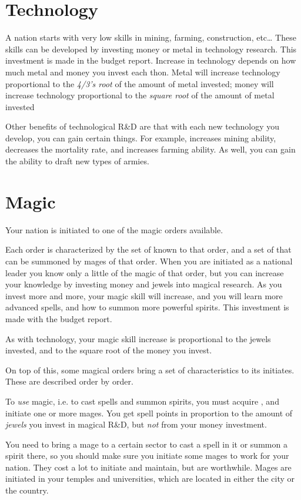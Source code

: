 \section{Technology}
A nation starts with very low skills in mining, farming, construction,
etc\dots{} These skills can be developed by investing money or metal
in technology research.  This investment is made in the budget report.
Increase in technology depends on how much metal and money you invest
each thon.  Metal will increase technology proportional to the
\emph{4/3's root} of the amount of metal invested;
money will increase technology proportional
to the \emph{square root} of the amount of metal invested

Other benefits of technological R\&D are that with each new technology
you develop, you can gain certain things.  For example, 
increases mining ability, decreases the mortality rate, and increases
farming ability.  As well, you can gain the ability to draft
new types of armies.

\section{Magic}
Your nation is initiated to one of the magic orders available.

Each order is characterized by the set of  known to that
order, and a set of  that can be summoned by mages of
that order.  When you are initiated as a national leader you know only
a little of the magic of that order, but you can increase your
knowledge by investing money and jewels into magical research.  As you
invest more and more, your magic skill will increase, and you will
learn more advanced spells, and how to summon more powerful spirits.
This investment is made with the budget report.

As with technology, your magic skill increase is proportional to the
jewels invested, and to the square root of the money you invest.

On top of this, some magical orders bring a set of characteristics to
its initiates.  These are described order by order.

To \emph{use} magic, i.e. to cast spells and summon spirits, you must
acquire , and initiate one or more mages.  You get
spell points in proportion to the amount of \emph{jewels} you invest
in magical R\&D, but \emph{not} from your money investment.

You need to bring a mage to a certain sector to cast a spell in it or
summon a spirit there, so you should make sure you initiate some mages
to work for your nation.  They cost a lot to initiate and maintain,
but are worthwhile.  Mages are initiated in your temples and
universities, which are located in either the city or the country.

